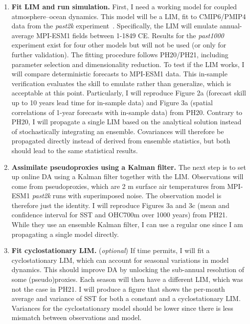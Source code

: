 \documentclass[parskip=half,DIV=14,bookmarkpackage=false]{scrartcl}
\begin{document}
\begin{enumerate}
    \item \textbf{Fit \gls{LIM} and run simulation.} First, I need a working model for coupled atmosphere--ocean dynamics. This model will be a \gls{LIM}, fit to CMIP6/PMIP4 data from the \emph{past2k} experiment~\autocite{Jungclaus2017}. Specifically, the \gls{LIM} will emulate annual-average MPI-ESM1 fields between 1-1849 CE. Results for the \emph{past1000} experiment exist for four other models but will not be used (or only for further validation). The fitting procedure follows PH20/PH21, including parameter selection and dimensionality reduction. To test if the \gls{LIM} works, I will compare deterministic forecasts to MPI-ESM1 data. This in-sample verification evaluates the skill to emulate rather than generalize, which is acceptable at this point. Particularly, I will reproduce Figure 2a (forecast skill up to 10 years lead time for in-sample data) and Figure 3a (spatial correlations of 1-year forecasts with in-sample data) from PH20. Contrary to PH20, I will propagate a single \gls{LIM} based on the analytical solution instead of stochastically integrating an ensemble. Covariances will therefore be propagated directly instead of derived from ensemble statistics, but both should lead to the same statistical results.
    \item \textbf{Assimilate pseudoproxies using a Kalman filter.} The next step is to set up online \gls{DA} using a Kalman filter together with the \gls{LIM}. Observations will come from pseudoproxies, which are 2 m surface air temperatures from MPI-ESM1 \emph{past2k} runs with superimposed noise. The observation model is therefore just the identity. I will reproduce Figures 3a and 3c (mean and confidence interval for SST and OHC700m over 1000 years) from PH21. While they use an ensemble Kalman filter, I can use a regular one since I am propagating a single model directly.
    \item \textbf{Fit cyclostationary \gls{LIM}.} (\emph{optional}) If time permits, I will fit a cyclostationary \gls{LIM}, which can account for seasonal variations in model dynamics. This should improve \gls{DA} by unlocking the sub-annual resolution of some (pseudo)proxies. Each season will then have a different \gls{LIM}, which was not the case in PH21. I will produce a figure that shows the per-month average and variance of SST for both a constant and a cyclostationary \gls{LIM}. Variances for the cyclostationary model should be lower since there is less mismatch between observations and model.
\end{enumerate}






\printbibliography
\end{document}
